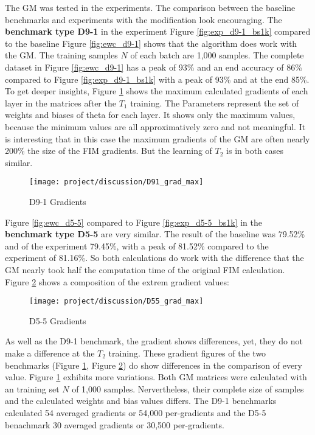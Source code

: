 The GM was tested in the experiments.
The comparison between the baseline benchmarks and experiments with the modification look encouraging.
\newline
The \textbf{benchmark type D9-1} in the experiment Figure \ref{fig:exp_d9-1_bs1k} compared to the baseline Figure \ref{fig:ewc_d9-1} shows that the algorithm does work with the GM.
The training samples $N$ of each batch are 1,000 samples.
The complete dataset in Figure \ref{fig:ewc_d9-1} has a peak of 93\% and an end accuracy of 86\% compared to Figure \ref{fig:exp_d9-1_bs1k} with a peak of 93\% and at the end 85\%.
\newline
To get deeper insights, Figure \ref{fig:dis_d91} shows the maximum calculated gradients of each layer in the matrices after the $T_1$ training.
The Parameters represent the set of weights and biases of theta for each layer.
It shows only the maximum values, because the minimum values are all approximatively zero and not meaningful.
It is interesting that in this case the maximum gradients of the GM are often nearly 200\% the size of the FIM gradients.
But the learning of $T_2$ is in both cases similar.

\begin{figure}[H]
    \centering
    \texttt{[image: project/discussion/D91\_grad\_max]}
    \caption{D9-1 Gradients}
    \label{fig:dis_d91}
\end{figure}

Figure \ref{fig:ewc_d5-5} compared to Figure \ref{fig:exp_d5-5_bs1k} in the \textbf{benchmark type D5-5} are very similar.
The result of the baseline was 79.52\% and of the experiment 79.45\%, with a peak of 81.52\% compared to the experiment of 81.16\%.
So both calculations do work with the difference that the GM nearly took half the computation time of the original FIM calculation.
Figure \ref{fig:dis_d55} shows a composition of the extrem gradient values:

\begin{figure}[H]
    \centering
    \texttt{[image: project/discussion/D55\_grad\_max]}
    \caption{D5-5 Gradients}
    \label{fig:dis_d55}
\end{figure}

As well as the D9-1 benchmark, the gradient shows differences, yet, they do not make 
a difference at the $T_2$ training.
\newline
These gradient figures of the two benchmarks (Figure \ref{fig:dis_d91}, Figure \ref{fig:dis_d55}) do show differences in the comparison of every value.
Figure \ref{fig:dis_d91} exhibits more variations.
Both GM matrices were calculated with an training set $N$ of 1,000 samples.
Nervertheless, their complete size of samples and the calculated weights and bias values differs.
The D9-1 benchmarks calculated 54 averaged gradients or 54,000 per-gradients and the D5-5 benachmark 30 averaged gradients or 30,500 per-gradients.

